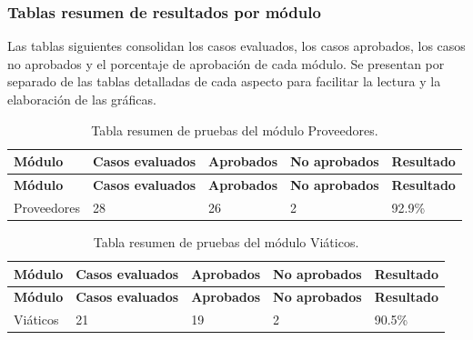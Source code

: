 \subsubsection{Tablas resumen de resultados por módulo}
Las tablas siguientes consolidan los casos evaluados, los casos aprobados, los casos no aprobados y el porcentaje de aprobación de cada módulo. Se presentan por separado de las tablas detalladas de cada aspecto para facilitar la lectura y la elaboración de las gráficas.

\begingroup\fontsize{8}{9}\selectfont\setlength{\tabcolsep}{4pt}
\begin{xltabular}{\linewidth}{@{}p{3.0cm}p{2.4cm}p{2.4cm}p{2.4cm}p{2.4cm}@{}}

\caption{Tabla resumen de pruebas del módulo Proveedores.}\label{tab:cap4_resumen_proveedores}\\
\toprule
\textbf{Módulo} & \textbf{Casos evaluados} & \textbf{Aprobados} & \textbf{No aprobados} & \textbf{Resultado}\\
\midrule
\endfirsthead
\toprule
\textbf{Módulo} & \textbf{Casos evaluados} & \textbf{Aprobados} & \textbf{No aprobados} & \textbf{Resultado}\\
\midrule
\endhead
\endfoot
\bottomrule
\endlastfoot

Proveedores & 28 & 26 & 2 & 92.9\%\\

\bottomrule
\end{xltabular}
\endgroup

\begingroup\fontsize{8}{9}\selectfont\setlength{\tabcolsep}{4pt}
\begin{xltabular}{\linewidth}{@{}p{3.0cm}p{2.4cm}p{2.4cm}p{2.4cm}p{2.4cm}@{}}

\caption{Tabla resumen de pruebas del módulo Viáticos.}\label{tab:cap4_resumen_viaticos}\\
\toprule
\textbf{Módulo} & \textbf{Casos evaluados} & \textbf{Aprobados} & \textbf{No aprobados} & \textbf{Resultado}\\
\midrule
\endfirsthead
\toprule
\textbf{Módulo} & \textbf{Casos evaluados} & \textbf{Aprobados} & \textbf{No aprobados} & \textbf{Resultado}\\
\midrule
\endhead
\endfoot
\bottomrule
\endlastfoot

Viáticos & 21 & 19 & 2 & 90.5\%\\

\bottomrule
\end{xltabular}
\endgroup

